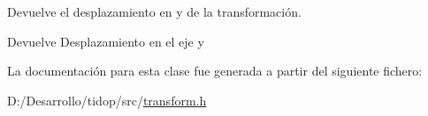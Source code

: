 Devuelve el desplazamiento en y de la transformación. 

\begin{DoxyReturn}{Devuelve}
Desplazamiento en el eje y 
\end{DoxyReturn}


La documentación para esta clase fue generada a partir del siguiente fichero\+:\begin{DoxyCompactItemize}
\item 
D\+:/\+Desarrollo/tidop/src/\hyperlink{transform_8h}{transform.\+h}\end{DoxyCompactItemize}
